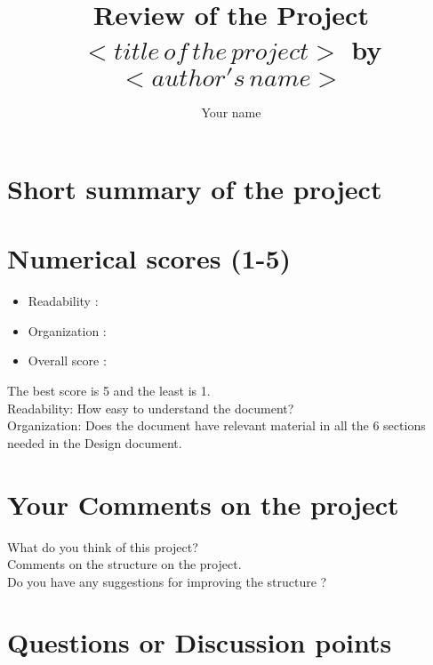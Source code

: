 \documentclass{article}
\begin{document}
\title{Review of the Project $<title\, of\, the \, project>$ by $<author's\,name>$ }
\author{Your name} 
\maketitle
\section{Short summary of the project}

\section{Numerical scores (1-5)}


\begin{itemize}
\item Readability : 
\item Organization : 
\item Overall score : 
\end{itemize}

\noindent The best score is 5 and the least is 1.\\
Readability: How easy to understand the document? \\
Organization: Does the document have relevant material in all the 6 sections needed in  the Design document.\\

\section{Your Comments on the project}
What do you think of this project?\\
Comments on the structure on the project.\\
Do you have any suggestions for improving the structure ? \\ 


\section{Questions or Discussion points}
\end{document}
